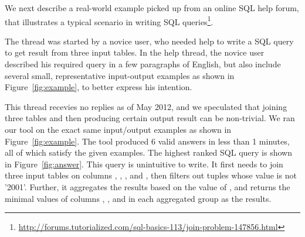We next describe a real-world example picked up from
an online SQL help forum, that illustrates a typical scenario
in writing SQL queries\footnote{\url{http://forums.tutorialized.com/sql-basics-113/join-problem-147856.html}}.

The thread was started by a novice user, who needed help to write a
SQL query to get result from three input tables. In the help thread, the
novice user described his required query in a few paragraphs of
English, but also include several small, representative input-output
examples as shown in Figure~\ref{fig:example}, to better express
his intention. 

This thread recevies no replies as of May 2012, and we speculated that
joining three tables and then producing certain output result can
be non-trivial. We ran our tool on the exact same input/output examples
as shown in Figure~\ref{fig:example}. The tool produced 6 valid answers
in less than 1 minutes, all of which satisfy the given examples. The
highest ranked SQL query is shown in Figure~\ref{fig:answer}.
This query is unintuitive to write. It first needs to join three input tables
on columns , ,
, and ,
then filters out tuples whose  value
is not '2001'. Further, it aggregates the results based on
the value of , and returns the minimal
values of columns , , and 
in each aggregated group as the results.



